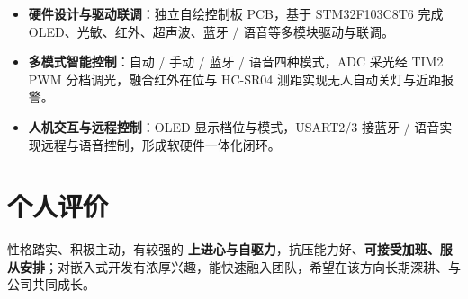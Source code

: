 \documentclass[10pt,a4paper]{article}
\begin{document}
\begin{itemize}[leftmargin=1.5em, itemsep=1pt, parsep=0pt, topsep=2pt]
    \item \textbf{硬件设计与驱动联调}：独立自绘控制板 PCB，基于 STM32F103C8T6 完成 OLED、光敏、红外、超声波、蓝牙 / 语音等多模块驱动与联调。
    \item \textbf{多模式智能控制}：自动 / 手动 / 蓝牙 / 语音四种模式，ADC 采光经 TIM2 PWM 分档调光，融合红外在位与 HC-SR04 测距实现无人自动关灯与近距报警。
    \item \textbf{人机交互与远程控制}：OLED 显示档位与模式，USART2/3 接蓝牙 / 语音实现远程与语音控制，形成软硬件一体化闭环。
\end{itemize}

\vspace{0.15em}

\section{\faUser\hspace{0.4em}个人评价}

性格踏实、积极主动，有较强的 \textbf{上进心与自驱力}，抗压能力好、\textbf{可接受加班、服从安排}；对嵌入式开发有浓厚兴趣，能快速融入团队，希望在该方向长期深耕、与公司共同成长。
\end{document}

